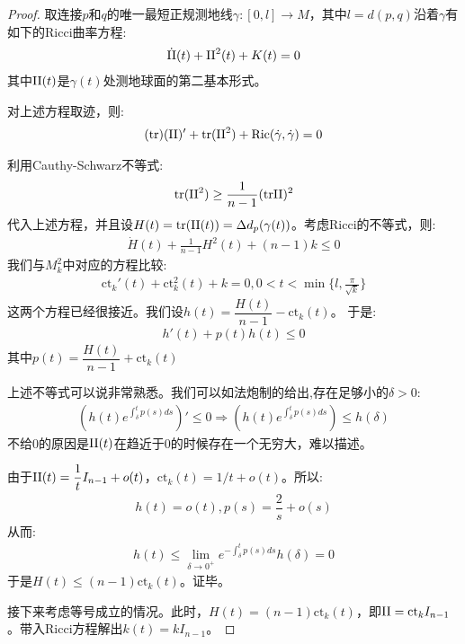 \begin{proof}
    取连接$p$和$q$的唯一最短正规测地线$\gamma:[0,l]\to M$，其中$l=d(p,q)$沿着$\gamma$有如下的Ricci曲率方程:
    \begin{align*}
        \dot{\mathrm{II}}(t)+\mathrm{II}^2(t)+K(t)=0
    \end{align*}
    其中$\mathrm{II}(t)$是$\gamma(t)$处测地球面的第二基本形式。
    
    对上述方程取迹，则:
    \begin{align*}
        (\mathrm{tr})(\mathrm{II})'+\mathrm{tr}(\mathrm{II}^2)+\mathrm{Ric}(\dot{\gamma},\dot{\gamma})=0
    \end{align*}

    利用Cauthy-Schwarz不等式:
    \begin{align*}
        \mathrm{tr}(\mathrm{II}^2)\geq \frac{1}{n-1}(\mathrm{tr}\mathrm{II})^2
    \end{align*}
    代入上述方程，并且设$H(t)=\mathrm{tr}(\mathrm{II}(t))=\Delta d_p(\gamma(t))$。考虑Ricci的不等式，则:
    \begin{align*}
        \dot{H}(t)+\frac{1}{n-1}H^2(t)+(n-1)k \leq 0
    \end{align*}
    我们与$M_k^2$中对应的方程比较:
    \begin{align*}
        \mathrm{ct}_k'(t)+\mathrm{ct}_k^2(t)+k=0, 0<t<\min\{l,\frac{\pi}{\sqrt{k}}\}
    \end{align*}
    这两个方程已经很接近。我们设$h(t)=\dfrac{H(t)}{n-1}-\mathrm{ct}_k(t)$。
    于是:
    \begin{align*}
        h'(t)+p(t)h(t)\leq 0
    \end{align*}
    其中$p(t)=\dfrac{H(t)}{n-1}+\mathrm{ct}_k(t)$

    上述不等式可以说非常熟悉。我们可以如法炮制的给出,存在足够小的$\delta>0$:
    \begin{align*}
        (h(t)e^{\int_\delta^t p(s)ds})'\leq 0 \Rightarrow (h(t)e^{\int_\delta^t p(s)ds})\leq h(\delta)
    \end{align*}
    不给$0$的原因是$\mathrm{II}(t)$在趋近于$0$的时候存在一个无穷大，难以描述。

    由于$\mathrm{II}(t)=\dfrac{1}{t}I_{n-1}+o(t)$，$\mathrm{ct}_k(t)=1/t+o(t)$。所以:
    \begin{align*}
        h(t)=o(t),p(s)=\dfrac{2}{s}+o(s)
    \end{align*}
    从而:
    \begin{align*}
        h(t)\leq \lim_{\delta \to 0^+}e^{-\int_{\delta}^t p(s)ds}h(\delta)=0
    \end{align*}
    于是$H(t)\leq (n-1)\mathrm{ct}_k(t)$。证毕。

    接下来考虑等号成立的情况。此时，$H(t)=(n-1)\mathrm{ct}_k(t)$，即$\mathrm{II}=\mathrm{ct}_k I_{n-1}$。带入Ricci方程解出$k(t)=kI_{n-1}$。
\end{proof}
